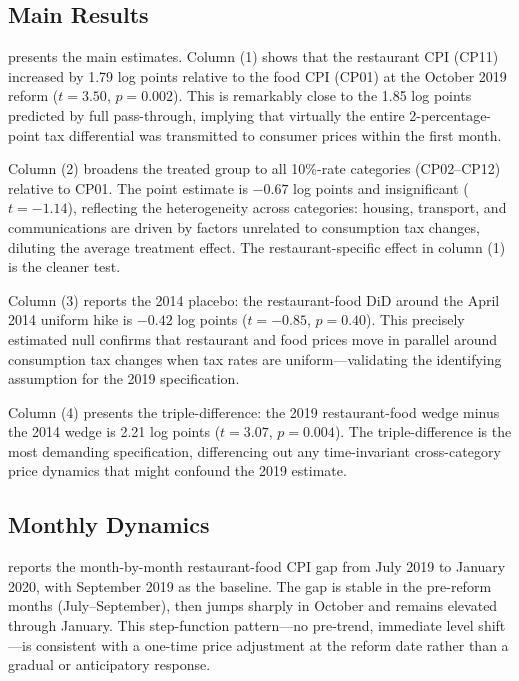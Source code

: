 \documentclass[12pt]{article}
\begin{document}
\subsection{Main Results}

 presents the main estimates. Column (1) shows that the restaurant CPI (CP11) increased by 1.79 log points relative to the food CPI (CP01) at the October 2019 reform ($t = 3.50$, $p = 0.002$). This is remarkably close to the 1.85 log points predicted by full pass-through, implying that virtually the entire 2-percentage-point tax differential was transmitted to consumer prices within the first month.



Column (2) broadens the treated group to all 10\%-rate categories (CP02--CP12) relative to CP01. The point estimate is $-0.67$ log points and insignificant ($t = -1.14$), reflecting the heterogeneity across categories: housing, transport, and communications are driven by factors unrelated to consumption tax changes, diluting the average treatment effect. The restaurant-specific effect in column (1) is the cleaner test.

Column (3) reports the 2014 placebo: the restaurant-food DiD around the April 2014 uniform hike is $-0.42$ log points ($t = -0.85$, $p = 0.40$). This precisely estimated null confirms that restaurant and food prices move in parallel around consumption tax changes when tax rates are uniform---validating the identifying assumption for the 2019 specification.

Column (4) presents the triple-difference: the 2019 restaurant-food wedge minus the 2014 wedge is 2.21 log points ($t = 3.07$, $p = 0.004$). The triple-difference is the most demanding specification, differencing out any time-invariant cross-category price dynamics that might confound the 2019 estimate.

\subsection{Monthly Dynamics}

 reports the month-by-month restaurant-food CPI gap from July 2019 to January 2020, with September 2019 as the baseline. The gap is stable in the pre-reform months (July--September), then jumps sharply in October and remains elevated through January. This step-function pattern---no pre-trend, immediate level shift---is consistent with a one-time price adjustment at the reform date rather than a gradual or anticipatory response.
\end{document}
